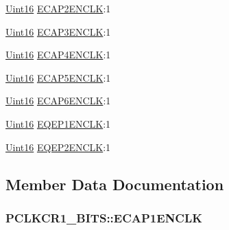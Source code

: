 \begin{DoxyCompactItemize}
\item 
\hyperlink{_d_s_p2833x___device_8h_a59a9f6be4562c327cbfb4f7e8e18f08b}{Uint16} \hyperlink{struct_p_c_l_k_c_r1___b_i_t_s_a0afec24f9f4fa93fe4300ff56aa50f4c}{E\+C\+A\+P2\+E\+N\+C\+L\+K}\+:1
\item 
\hyperlink{_d_s_p2833x___device_8h_a59a9f6be4562c327cbfb4f7e8e18f08b}{Uint16} \hyperlink{struct_p_c_l_k_c_r1___b_i_t_s_a8cf57cd4e1998d4e0ed353c4671b8956}{E\+C\+A\+P3\+E\+N\+C\+L\+K}\+:1
\item 
\hyperlink{_d_s_p2833x___device_8h_a59a9f6be4562c327cbfb4f7e8e18f08b}{Uint16} \hyperlink{struct_p_c_l_k_c_r1___b_i_t_s_a4c5e88c506d19dd42c8b9fe888556165}{E\+C\+A\+P4\+E\+N\+C\+L\+K}\+:1
\item 
\hyperlink{_d_s_p2833x___device_8h_a59a9f6be4562c327cbfb4f7e8e18f08b}{Uint16} \hyperlink{struct_p_c_l_k_c_r1___b_i_t_s_af9ca782e88e8f8d9212c306d98d5f490}{E\+C\+A\+P5\+E\+N\+C\+L\+K}\+:1
\item 
\hyperlink{_d_s_p2833x___device_8h_a59a9f6be4562c327cbfb4f7e8e18f08b}{Uint16} \hyperlink{struct_p_c_l_k_c_r1___b_i_t_s_a2f0b138a2ae9ff2e9f3a336d55a0323b}{E\+C\+A\+P6\+E\+N\+C\+L\+K}\+:1
\item 
\hyperlink{_d_s_p2833x___device_8h_a59a9f6be4562c327cbfb4f7e8e18f08b}{Uint16} \hyperlink{struct_p_c_l_k_c_r1___b_i_t_s_aba660657d56e0c8ae91d48b6f9a6754f}{E\+Q\+E\+P1\+E\+N\+C\+L\+K}\+:1
\item 
\hyperlink{_d_s_p2833x___device_8h_a59a9f6be4562c327cbfb4f7e8e18f08b}{Uint16} \hyperlink{struct_p_c_l_k_c_r1___b_i_t_s_ae405ac54ad8fe86b84563ff3bf601fea}{E\+Q\+E\+P2\+E\+N\+C\+L\+K}\+:1
\end{DoxyCompactItemize}


\subsection{Member Data Documentation}
\hypertarget{struct_p_c_l_k_c_r1___b_i_t_s_a6e74093f6bcaf284d22924f17e4c82ae}{}
\subsubsection[{E\+C\+A\+P1\+E\+N\+C\+L\+K}]{ P\+C\+L\+K\+C\+R1\+\_\+\+B\+I\+T\+S\+::\+E\+C\+A\+P1\+E\+N\+C\+L\+K}\label{struct_p_c_l_k_c_r1___b_i_t_s_a6e74093f6bcaf284d22924f17e4c82ae}
\hypertarget{struct_p_c_l_k_c_r1___b_i_t_s_a0afec24f9f4fa93fe4300ff56aa50f4c}{}
